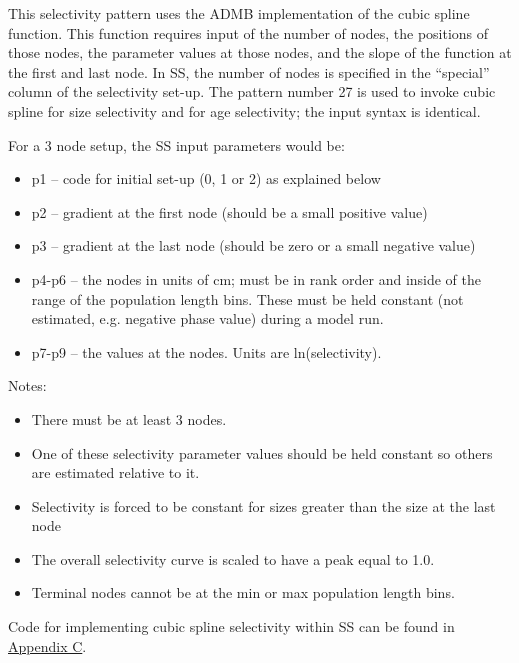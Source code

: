 This selectivity pattern uses the ADMB implementation of the cubic spline function. This function requires input of the number of nodes, the positions of those nodes, the parameter values at those nodes, and the slope of the function at the first and last node.  In SS, the number of nodes is specified in the “special” column of the selectivity set-up.  The pattern number 27 is used to invoke cubic spline for size selectivity and for age selectivity; the input syntax is identical.
	
For a 3 node setup, the SS input parameters would be:
	\begin{itemize}
		\item p1 – 	code for initial set-up (0, 1 or 2) as explained below
		\item p2 – 	gradient at the first node (should be a small positive value)
		\item p3 – 	gradient at the last node (should be zero or a small negative value)
		\item p4-p6 – the nodes in units of cm; must be in rank order and inside of the range of the population length bins.  These must be held constant (not estimated, e.g. negative phase value) during a model run.
		\item  p7-p9 – the values at the nodes.  Units are ln(selectivity).
	\end{itemize}

Notes:
	\begin{itemize}
		\item There must be at least 3 nodes.
		\item One of these selectivity parameter values should be held constant so others are estimated relative to it.
		\item Selectivity is forced to be constant for sizes greater than the size at the last node
		\item The overall selectivity curve is scaled to have a peak equal to 1.0.
		\item Terminal nodes cannot be at the min or max population length bins.
	\end{itemize}
	
Code for implementing cubic spline selectivity within SS can be found in \hyperlink{CubicSpline}{Appendix C}.

